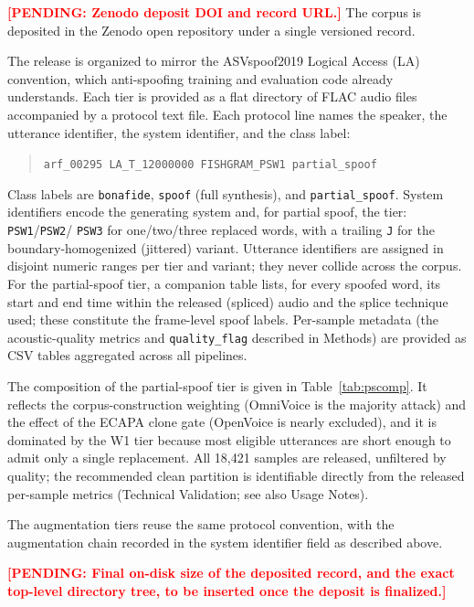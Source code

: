 \documentclass[11pt]{article}
\newcommand{\PENDING}[1]{\textcolor{red}{\textbf{[PENDING: #1]}}}
\begin{document}
\PENDING{Zenodo deposit DOI and record URL.} The corpus is deposited in
the Zenodo open repository under a single versioned record.

The release is organized to mirror the ASVspoof2019 Logical Access (LA)
convention, which anti-spoofing training and evaluation code already
understands. Each tier is provided as a flat directory of FLAC audio
files accompanied by a protocol text file. Each protocol line names the
speaker, the utterance identifier, the system identifier, and the
class label:

\begin{quote}\small
\texttt{arf\_00295\ LA\_T\_12000000\ FISHGRAM\_PSW1\ partial\_spoof}
\end{quote}

Class labels are \texttt{bonafide}, \texttt{spoof} (full synthesis), and
\texttt{partial\_spoof}. System identifiers encode the generating system
and, for partial spoof, the tier: \texttt{PSW1}/\texttt{PSW2}/%
\texttt{PSW3} for one/two/three replaced words, with a trailing
\texttt{J} for the boundary-homogenized (jittered) variant. Utterance
identifiers are assigned in disjoint numeric ranges per tier and
variant; they never collide across the corpus. For the
partial-spoof tier, a companion table lists, for every spoofed word, its
start and end time within the released (spliced) audio and the splice
technique used; these constitute the frame-level spoof labels. Per-sample
metadata (the acoustic-quality metrics and \texttt{quality\_flag}
described in Methods) are provided as CSV tables aggregated across all
pipelines.

The composition of the partial-spoof tier is given in
Table~\ref{tab:pscomp}. It reflects the corpus-construction weighting
(OmniVoice is the majority attack) and the effect of the ECAPA clone
gate (OpenVoice is nearly excluded), and it is dominated by the W1 tier
because most eligible utterances are short enough to admit only a
single replacement. All 18{,}421 samples are released, unfiltered by
quality; the recommended clean partition is identifiable directly from
the released per-sample metrics (Technical Validation; see also Usage
Notes).

The augmentation tiers reuse the same protocol convention, with the
augmentation chain recorded in the system identifier field as described
above.

\PENDING{Final on-disk size of the deposited record, and the exact
top-level directory tree, to be inserted once the deposit is finalized.}
\end{document}
